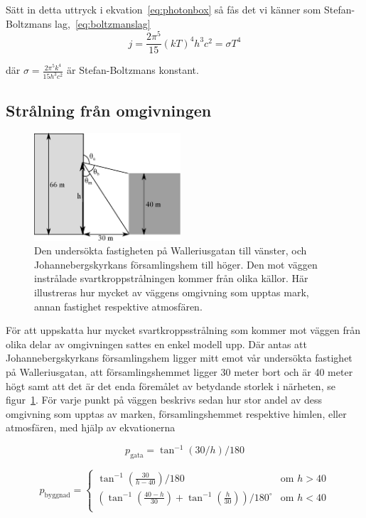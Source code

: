 Sätt in detta uttryck i ekvation~\eqref{eq:photonbox} så fås det vi känner som Stefan-Boltzmans lag,~\eqref{eq:boltzmanslag}
\begin{equation}
j=\frac{2\pi^5}{15}{(kT)^4}{h^3c^2}=\sigma T^4
\end{equation}

där $\sigma=\frac{2\pi^5k^4}{15h^3c^2}$ är Stefan-Boltzmans konstant.


\subsection{Strålning från omgivningen}
\label{sec:bb_sur}

\begin{figure}[hpbt]
\centering
\includegraphics[height=4cm]{images/blackbody_surroundings.eps}
\caption{\label{fig:surroundings}{Den undersökta fastigheten på 
Wallerius\-gatan till vänster, och Johannebergs\-kyrkans församlings\-hem till höger. Den mot väggen instrålade svartkroppstrålningen kommer från olika källor. Här illustreras hur mycket av väggens omgivning som upptas mark, annan fastighet respektive atmosfären.}}
\end{figure}

För att uppskatta hur mycket svartkroppsstrålning som kommer mot väggen från olika 
delar av omgivningen sattes en enkel modell upp. Där antas att Johannebergskyrkans 
församlingshem ligger mitt emot vår undersökta fastighet på Walleriusgatan, att 
församlingshemmet ligger 30 meter bort och är 40 meter högt samt att det är det enda 
föremålet av betydande storlek i närheten, se figur~\ref{fig:surroundings}. För varje punkt
 på väggen beskrivs sedan hur stor andel av dess omgivning som upptas av marken, 
 församlingshemmet respektive himlen, eller atmosfären, med hjälp av ekvationerna

\begin{equation}
p_\text{gata}=\tan^{-1}(30/h)/180
\end{equation}

\begin{equation}
p_\text{byggnad}= \left\{
\begin{array}{rl}
\tan^{-1}(\frac{30}{h-40})/180 & \text{om } h > 40 \\
(\tan^{-1}(\frac{40-h}{30})+\tan^{-1}(\frac{h}{30}))/180^\circ & \text{om } h < 40 \\
\end{array} \right.
\end{equation}

